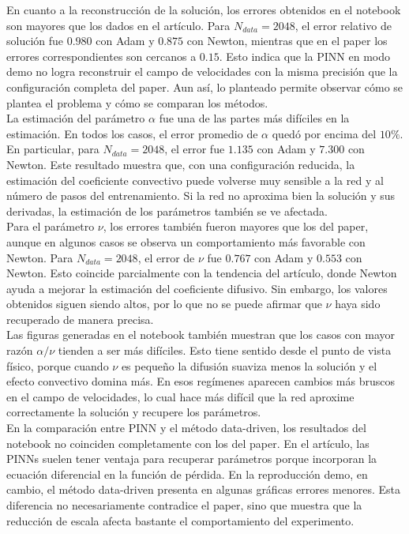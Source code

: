 \documentclass[10pt,letterpaper,twocolumn]{article}
\begin{document}
En cuanto a la reconstrucción de la solución, los errores obtenidos en el notebook son mayores que los dados en el artículo. Para $N_{data}=2048$, el error relativo de solución fue $0.980$ con Adam y $0.875$ con Newton, mientras que en el paper los errores correspondientes son cercanos a $0.15$. Esto indica que la PINN en modo demo no logra reconstruir el campo de velocidades con la misma precisión que la configuración completa del paper. Aun así, lo planteado permite observar cómo se plantea el problema y cómo se comparan los métodos.\\

La estimación del parámetro $\alpha$ fue una de las partes más difíciles en la estimación. En todos los casos, el error promedio de $\alpha$ quedó por encima del $10\%$. En particular, para $N_{data}=2048$, el error fue $1.135$ con Adam y $7.300$ con Newton. Este resultado muestra que, con una configuración reducida, la estimación del coeficiente convectivo puede volverse muy sensible a la red y al número de pasos del entrenamiento. Si la red no aproxima bien la solución y sus derivadas, la estimación de los parámetros también se ve afectada.\\

Para el parámetro $\nu$, los errores también fueron mayores que los del paper, aunque en algunos casos se observa un comportamiento más favorable con Newton. Para $N_{data}=2048$, el error de $\nu$ fue $0.767$ con Adam y $0.553$ con Newton. Esto coincide parcialmente con la tendencia del artículo, donde Newton ayuda a mejorar la estimación del coeficiente difusivo. Sin embargo, los valores obtenidos siguen siendo altos, por lo que no se puede afirmar que $\nu$ haya sido recuperado de manera precisa.\\

Las figuras generadas en el notebook también muestran que los casos con mayor razón $\alpha/\nu$ tienden a ser más difíciles. Esto tiene sentido desde el punto de vista físico, porque cuando $\nu$ es pequeño la difusión suaviza menos la solución y el efecto convectivo domina más. En esos regímenes aparecen cambios más bruscos en el campo de velocidades, lo cual hace más difícil que la red aproxime correctamente la solución y recupere los parámetros.\\

En la comparación entre PINN y el método data-driven, los resultados del notebook no coinciden completamente con los del paper. En el artículo, las PINNs suelen tener ventaja para recuperar parámetros porque incorporan la ecuación diferencial en la función de pérdida. En la reproducción demo, en cambio, el método data-driven presenta en algunas gráficas errores menores. Esta diferencia no necesariamente contradice el paper, sino que muestra que la reducción de escala afecta bastante el comportamiento del experimento.\\
\end{document}
